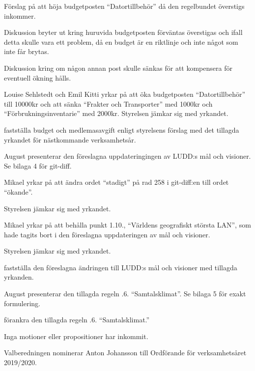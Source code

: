 \documentclass{protokoll}
\begin{document}
Förslag på att höja budgetposten ``Datortillbehör'' då den regelbundet
överstigs inkommer.  


Diskussion bryter ut kring huruvida budgetposten förväntas överstigas och ifall
detta skulle vara ett problem, då en budget är en riktlinje och inte något som
inte får brytas.  


Diskussion kring om någon annan post skulle sänkas för att kompensera för
eventuell ökning hålls. 

Louise Sehlstedt och Emil Kitti yrkar på att öka budgetposten ``Datortillbehör'' till 
10000kr och att sänka ``Frakter och Transporter'' med 1000kr och ``Förbrukningsinventarie'' med 2000kr. 
Styrelsen jämkar sig med yrkandet. 
\begin{beslut}
  \att fastställa budget och medlemasavgift enligt styrelsens förslag med det
  tillagda yrkandet för nästkommande verksamhetsår. 
\end{beslut}

August presenterar den föreslagna uppdateringingen av LUDD:s mål och visioner.
Se bilaga 4 för git-diff.

Mikael yrkar på att ändra ordet ``stadigt'' på rad 258 i git-diff:en till ordet
``ökande''. 

Styrelsen jämkar sig med yrkandet. 


Mikael yrkar på att behålla punkt 1.10., ``Världens geografiskt största LAN'',
som hade tagits bort i den föreslagna uppdateringen av mål och visioner. 

Styrelsen jämkar sig med yrkandet. 

\begin{beslut}
  \att fastställa den föreslagna ändringen till LUDD:s mål och visioner med
  tillagda yrkanden. 
\end{beslut}


August presenterar den tillagda regeln .6. ``Samtalsklimat''. Se bilaga 5
för exakt formulering.

\begin{beslut}
  \att förankra den tillagda regeln .6. ``Samtalsklimat.''
\end{beslut}

Inga motioner eller propositioner har inkommit.

Valberedningen nominerar Anton Johansson till Ordförande för verksamhetsåret 2019/2020.
\end{document}
